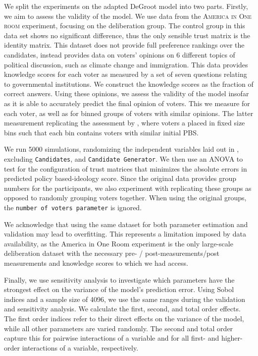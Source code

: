 We split the experiments on the adapted DeGroot model into two parts. Firstly,
we aim to assess the validity of the model. We use data from the
\textsc{America in One room} experiment, focusing on the deliberation group.
The control group in this data set shows no significant difference, thus the
only sensible trust matrix is the identity matrix. This dataset does not
provide full preference rankings over the candidates, instead provides data on
voters' opinions on 6 different topics of political discussion, such as climate
change and immigration. This data provides knowledge scores for each voter as
measured by a set of seven questions relating to governmental institutions. We
construct the knowledge scores as the fraction of correct answers. Using these
opinions, we assess the validity of the model insofar as it is able to
accurately predict the final opinion of voters. This we measure for each voter,
as well as for binned groups of voters with similar opinions. The latter
measurement replicating the assessment by
\citet{fishkinCanDeliberationHave2024}, where voters a placed in fixed size bins such that each bin contains voters with similar initial PBS.

We run 5000 simulations, randomizing the independent variables laid out in
, excluding \texttt{Candidates}, and
\texttt{Candidate Generator}. We then use an ANOVA to test for the
configuration of trust matrices that minimizes the absolute errors in predicted
policy based-ideology score. Since the original data provides group numbers for
the participants, we also experiment with
replicating these groups as opposed to randomly grouping voters together. When
using the original groups, the \texttt{number of voters parameter} is ignored.

We acknowledge that using the same dataset for both parameter estimation and
validation may lead to overfitting. This represents a limitation imposed by
data availability, as the America in One Room experiment is the only
large-scale deliberation dataset with the necessary pre- / post-measurements/post measurements and
knowledge scores to which we had access.





Finally, we use sensitivity analysis to investigate which parameters have the
strongest effect on the variance of the model's prediction error. Using Sobol
indices and a sample size of 4096, we use the same ranges during the validation and sensitivity analysis. We calculate the first, second, and total
order effects. The first order indices refer to their direct effects on the
variance of the model, while all other parameters are varied randomly. The second and
total order capture this for pairwise interactions of a variable and for all
first- and higher-order interactions of a variable, respectively.



